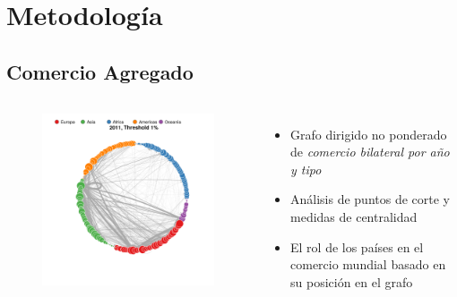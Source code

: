 \documentclass[compress]{beamer}
\begin{document}
\section{Metodología}

\subsection{Comercio Agregado}
\begin{frame}
\begin{columns}[c] 

\begin{figure}
\includegraphics[width=1.4\linewidth]{grafo_Circ_2011_1_pcnt}
\end{figure}

\small

\begin{itemize}
	
	\item[\faRebel] Grafo dirigido no ponderado de \textit{comercio bilateral por año y tipo} 
	\item[\faRebel] Análisis de puntos de corte y medidas de centralidad
	\item[\faRebel] El rol de los países en el comercio mundial basado en su posición en el grafo	
\end{itemize}


\end{columns}
\end{frame}
\end{document}
